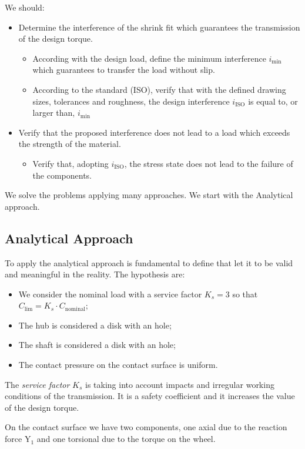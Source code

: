 \documentclass[a4paper,12pt]{article}
\begin{document}
We should:
\begin{itemize}
\item Determine the interference of the shrink fit which guarantees the transmission of the design torque.
		\begin{itemize}
			\item According with the design load, define the minimum interference $i_{\text{min}}$ which guarantees to transfer the load without slip.
			\item According to the standard (ISO), verify that with the defined drawing sizes, tolerances and roughness, the design interference $i_{\text{ISO}}$ is equal to, or larger than, $i_{\text{min}}$
		\end{itemize}
\item Verify that the proposed interference does not lead to a load which exceeds the strength of the material.
		\begin{itemize}
			\item Verify that, adopting $i_{\text{ISO}}$, the stress state does not lead to the failure of the components.
		\end{itemize}
\end{itemize}

We solve the problems applying many approaches. We start with the Analytical approach.

\subsection{Analytical Approach}

To apply the analytical approach is fundamental to define that let it to be valid and meaningful in the reality. The hypothesis are:
\begin{itemize}
\item We consider the nominal load with a service factor $K_s = 3$ so that $C_\text{lim} = K_s \cdot C_{\text{nominal}}$;
\item The hub is considered a disk with an hole;
\item The shaft is considered a disk with an hole;
\item The contact pressure on the contact surface is uniform.
\end{itemize}
The \emph{service factor} $K_s$ is taking into account impacts and irregular working conditions of the transmission. It is a safety coefficient and it increases the value of the design torque.

On the contact surface we have two components, one axial due to the reaction force $\text{Y}_1$ and one torsional due to the torque on the wheel.
\end{document}
